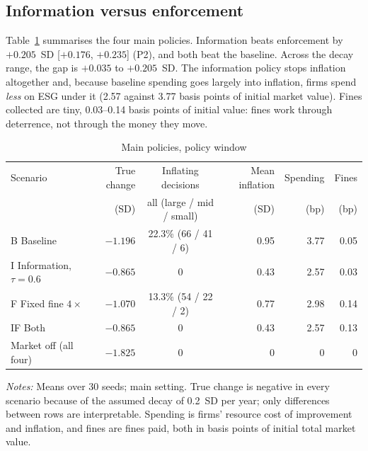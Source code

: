 \documentclass[11pt]{article}
\begin{document}
\subsection{Information versus enforcement}\label{sec:instruments}

Table~\ref{tab:policies} summarises the four main policies. Information beats enforcement by $+0.205$~SD [$+0.176$, $+0.235$] (P2), and both beat the baseline. Across the decay range, the gap is $+0.035$ to $+0.205$~SD. The information policy stops inflation altogether and, because baseline spending goes largely into inflation, firms spend \emph{less} on ESG under it (2.57 against 3.77 basis points of initial market value). Fines collected are tiny, 0.03--0.14 basis points of initial value: fines work through deterrence, not through the money they move.

\begin{table}[t]
\centering
\small
\begin{threeparttable}
\caption{Main policies, policy window}
\label{tab:policies}
\begin{tabular}{@{}lrcrrr@{}}
\toprule
Scenario & True change & Inflating decisions & Mean inflation & Spending & Fines \\
 & (SD) & all (large / mid / small) & (SD) & (bp) & (bp) \\
\midrule
B Baseline & $-1.196$ & 22.3\% (66 / 41 / 6) & 0.95 & 3.77 & 0.05 \\
I Information, $\tau = 0.6$ & $-0.865$ & 0 & 0.43 & 2.57 & 0.03 \\
F Fixed fine $4\times$ & $-1.070$ & 13.3\% (54 / 22 / 2) & 0.77 & 2.98 & 0.14 \\
IF Both & $-0.865$ & 0 & 0.43 & 2.57 & 0.13 \\
Market off (all four) & $-1.825$ & 0 & 0 & 0 & 0 \\
\bottomrule
\end{tabular}
\begin{tablenotes}[flushleft]\footnotesize
\item \textit{Notes:} Means over 30 seeds; main setting. True change is negative in every scenario because of the assumed decay of 0.2~SD per year; only differences between rows are interpretable. Spending is firms' resource cost of improvement and inflation, and fines are fines paid, both in basis points of initial total market value.
\end{tablenotes}
\end{threeparttable}
\end{table}
\end{document}
